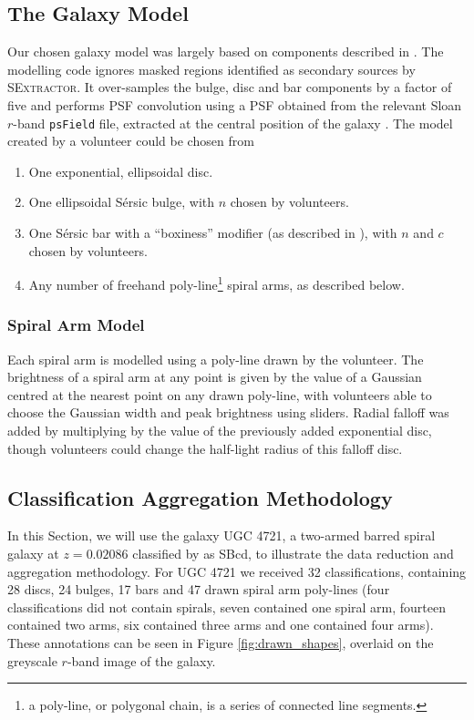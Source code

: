 \documentclass[trackchanges]{aastex63}
\begin{document}
\subsection{The Galaxy Model}
\label{section:galaxy-model}

Our chosen galaxy model was largely based on components described in \citet{galfit-paper}. The modelling code ignores masked regions identified as secondary sources by \textsc{SExtractor}. It over-samples the bulge, disc and bar components by a factor of five and performs PSF convolution using a PSF obtained from the relevant Sloan $r$-band \texttt{psField} file, extracted at the central position of the galaxy \citep{2002AJ....123..485S}. The model created by a volunteer could be chosen from

\begin{enumerate}
\item One exponential, ellipsoidal disc.
\item One ellipsoidal S\'ersic bulge, with $n$ chosen by volunteers.
\item One S\'ersic bar with a ``boxiness'' modifier (as described in \citealt{galfit-paper}), with $n$ and $c$ chosen by volunteers.
\item Any number of freehand poly-line\footnote{a poly-line, or polygonal chain, is a series of connected line segments.} spiral arms, as described below.
\end{enumerate}

\subsubsection{Spiral Arm Model}
Each spiral arm is modelled using a poly-line drawn by the volunteer. The brightness of a spiral arm at any point is given by the value of a Gaussian centred at the nearest point on any drawn poly-line, with volunteers able to choose the Gaussian width and peak brightness using sliders. Radial falloff was added by multiplying by the value of the previously added exponential disc, though volunteers could change the half-light radius of this falloff disc.

\subsection{Classification Aggregation Methodology}

In this Section, we will use the galaxy UGC 4721, a two-armed barred spiral galaxy at $z=0.02086$ classified by \citet{deVaucouleurs1991} as SBcd, to illustrate the data reduction and aggregation methodology. For UGC 4721 we received 32 classifications, containing 28 discs, 24 bulges, 17 bars and 47 drawn spiral arm poly-lines (four classifications did not contain spirals, seven contained one spiral arm, fourteen contained two arms, six contained three arms and one contained four arms). These annotations can be seen in Figure \ref{fig:drawn_shapes}, overlaid on the greyscale $r$-band image of the galaxy.
\end{document}
